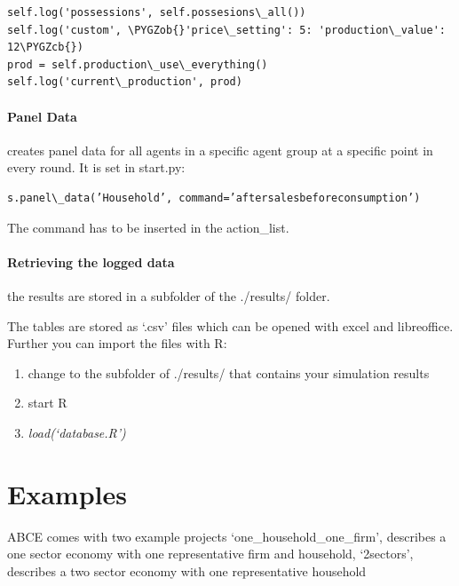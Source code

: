\documentclass[letterpaper,10pt,english]{sphinxmanual}
\def\PYGZob{\char`\{}
\def\PYGZcb{\char`\}}
\begin{document}
\begin{Verbatim}[commandchars=\\\{\}]
self.log('possessions', self.possesions\_all())
self.log('custom', \PYGZob{}'price\_setting': 5: 'production\_value': 12\PYGZcb{})
prod = self.production\_use\_everything()
self.log('current\_production', prod)
\end{Verbatim}


\subsubsection{Panel Data}
\label{Walk_through:panel-data}
{\hyperref[simulation:abce.Simulation.panel_data]{}} creates panel data for all agents in a specific
agent group at a specific point in every round. It is set in start.py:

\begin{Verbatim}[commandchars=\\\{\}]
s.panel\_data(’Household’, command=’aftersalesbeforeconsumption’)
\end{Verbatim}

The command has to be inserted in the action\_list.


\subsubsection{Retrieving the logged data}
\label{Walk_through:retrieving-the-logged-data}
the results are stored in a subfolder of the ./results/ folder.

The tables are stored as `.csv' files which can be opened with excel and
libreoffice.
Further you can import the files with R:
\begin{enumerate}
\item {} 
change to the subfolder of ./results/ that contains your simulation
results

\item {} 
start R

\item {} 
\emph{load(`database.R')}

\end{enumerate}


\chapter{Examples}
\label{examples::doc}\label{examples:examples}
ABCE comes with two example projects `one\_household\_one\_firm', describes
a one sector economy with one representative firm and household, `2sectors',
describes a two sector economy with one representative household
\end{document}
